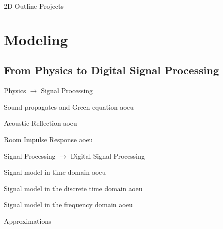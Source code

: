 \documentclass[9pt,dvipsnames]{beamer}
\renewenvironment{block}[1]{\begin{oldblock}{#1}\smallskip}{\end{oldblock}}
\begin{document}
\begin{frame}{2D Outline}
    Projects
\end{frame}

\section{Modeling}
\subsection{From Physics to Digital Signal Processing}
    
\begin{frame}{Physics $\longrightarrow$ Signal Processing}

    \begin{block}{Sound propagates and Green equation}
        aoeu
    \end{block}

    \begin{block}{Acoustic Reflection}
        aoeu
    \end{block}
    
    \begin{block}{Room Impulse Response}
        aoeu
    \end{block}

\end{frame}

\begin{frame}{Signal Processing $\longrightarrow$ \alert{Digital} Signal Processing}
    \begin{block}{Signal model in time domain}
        aoeu
    \end{block}
    
    \begin{block}{Signal model in the discrete time domain}
        aoeu
    \end{block}
    
    \begin{block}{Signal model in the frequency domain}
        aoeu
    \end{block}
    
    \begin{block}{Approximations}
        
    \end{block}

\end{frame}
\end{document}
